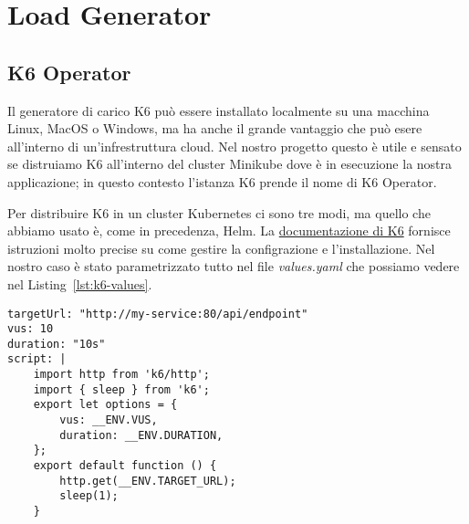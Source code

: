 \chapter{Load Generator}

\section{K6 Operator}
Il generatore di carico K6 può essere installato localmente su una macchina Linux, MacOS o Windows, ma ha anche il grande vantaggio che può esere all'interno di un'infrestruttura cloud. Nel nostro progetto questo è utile e sensato se distruiamo K6 all'interno del cluster Minikube dove è in esecuzione la nostra applicazione; in questo contesto l'istanza K6 prende il nome di K6 Operator.

Per distribuire K6 in un cluster Kubernetes ci sono tre modi, ma quello che abbiamo usato è, come in precedenza, Helm. La \href{https://grafana.com/docs/k6/latest/set-up/set-up-distributed-k6/}{documentazione di K6} fornisce istruzioni molto precise su come gestire la configrazione e l'installazione. Nel nostro caso è stato parametrizzato tutto nel file \textit{values.yaml} che possiamo vedere nel Listing~\ref{lst:k6-values}.
\begin{lstlisting}[caption=K6 \textit{values.yaml} file, label=lst:k6-values]
targetUrl: "http://my-service:80/api/endpoint"
vus: 10
duration: "10s"
script: |
    import http from 'k6/http';
    import { sleep } from 'k6';
    export let options = {
        vus: __ENV.VUS,
        duration: __ENV.DURATION,
    };
    export default function () {
        http.get(__ENV.TARGET_URL);
        sleep(1);
    }
\end{lstlisting}